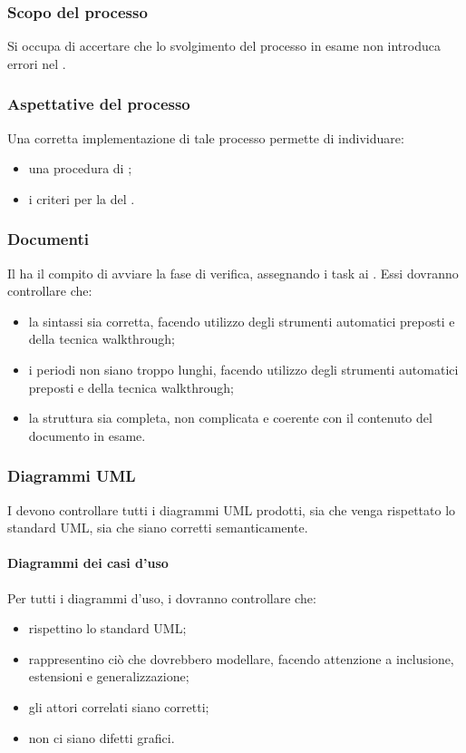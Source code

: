 \subsubsection{Scopo del processo}
Si occupa di accertare che lo svolgimento del processo in esame non introduca errori nel .
\subsubsection{Aspettative del processo}
Una corretta implementazione di tale processo permette di individuare:
\begin{itemize}
	\item una procedura di ;
	\item i criteri per la  del .
\end{itemize}
\subsubsection{Documenti}
Il \RESP{} ha il compito di avviare la fase di verifica, assegnando i task ai \VERP{}. Essi dovranno controllare che:
\begin{itemize}
	\item la sintassi sia corretta, facendo utilizzo degli strumenti automatici preposti e della tecnica walkthrough;
	\item i periodi non siano troppo lunghi, facendo utilizzo degli strumenti automatici preposti e della tecnica walkthrough;
	\item la struttura sia completa, non complicata e coerente con il contenuto del documento in esame.
\end{itemize}

\subsubsection{Diagrammi UML}
I \VERP{} devono controllare tutti i diagrammi UML prodotti, sia che
venga rispettato lo standard UML, sia che siano corretti semanticamente.
\paragraph{Diagrammi dei casi d'uso}
Per tutti i diagrammi d'uso, i \VERP{} dovranno controllare che:
\begin{itemize}
	\item rispettino lo standard UML;
	\item rappresentino ciò che dovrebbero modellare, facendo attenzione a inclusione, estensioni e generalizzazione;
	\item gli attori correlati siano corretti;
	\item non ci siano difetti grafici.
\end{itemize}

